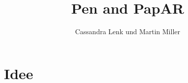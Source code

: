 \documentclass[11pt]{article}
\begin{document}
    \title{Pen and PapAR}
    \author{Cassandra Lenk und Martin Miller}

    \maketitle
    \newpage

    \tableofcontents
    \newpage

    \section{Idee}

    \section{}
\end{document}
